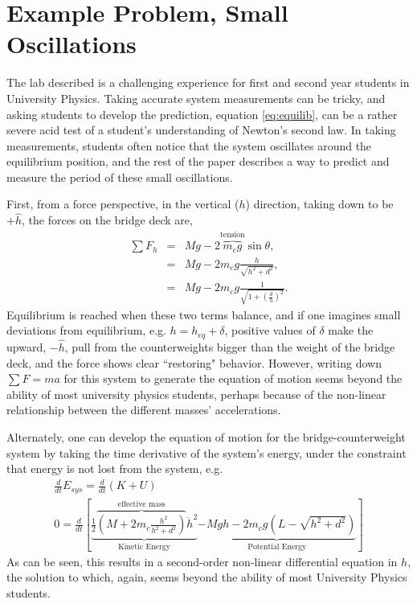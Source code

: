 \documentclass[12pt]{iopart}
\newcommand{\bea}{\begin{eqnarray}}
\newcommand{\eea}{\end{eqnarray}}
\begin{document}
\section{Example Problem, Small Oscillations}

The lab described is a challenging experience for first and second year students in University Physics.  Taking accurate system measurements can be tricky, and asking students to develop the prediction, equation \ref{eq:equilib}, can be a rather severe acid test of a student's understanding of Newton's second law.  In taking measurements, students often notice that the system oscillates around the equilibrium position, and the rest of the paper describes a way to predict and measure the period of these small oscillations.

First, from a force perspective, in the vertical ($h$) direction, taking down to be $+\hat h$, the forces on the bridge deck are,
\bea
\sum F_h &=& Mg - 2 \overbrace{m_c g}^\textrm{tension} \sin\theta, \nonumber \\
&=& Mg - 2 m_c g \frac{h}{\sqrt{h^2+d^2}},\nonumber\\
&=& Mg - 2 m_c g \frac{1}{\sqrt{1+\left(\frac{d}{h}\right)^2}}.
\eea   
Equilibrium is reached when these two terms balance, and if one imagines small deviations from equilibrium, e.g. $h=h_{eq}+\delta$, positive values of $\delta$ make the upward, $-\hat h$, pull from the counterweights bigger than the weight of the bridge deck, and the force shows clear ``restoring" behavior.  However, writing down $\sum F=ma$ for this system to generate the equation of motion seems  beyond the ability of most university physics students, perhaps because of the non-linear relationship between the different masses' accelerations.

Alternately, one can develop the equation of motion for the bridge-counterweight system by taking the time derivative of the system's energy, under the constraint that energy is not lost from the system, e.g. 
\bea
\frac{d}{dt} E_{sys} = \frac{d}{dt}\left(K+U \right) \nonumber \\
0 = \frac{d}{dt} \left[ 
\underbrace{
	\frac{1}{2} 
	\overbrace{\left( M  +  2m_c  \frac{h^2}{h^2+d^2} \right)}^\textrm{effective~mass} 
	\dot{h}^2}_\textrm{Kinetic~Energy} 
\underbrace{ - M g h - 2 m_c g \left(L-\sqrt{h^2+d^2}\right) }_\textrm{Potential~Energy} \right]
\label{eq:sys_E}
\eea   
As can be seen, this results in a second-order non-linear differential equation in $h$, the solution to which, again, seems beyond the ability of most University Physics students.
\end{document}
